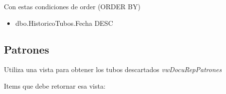 \documentclass[]{article}
\begin{document}
\par Con estas condiciones de order (ORDER BY)

\begin{itemize}[label=\textcolor{blue}{\textbullet}]
	\item dbo.HistoricoTubos.Fecha DESC
\end{itemize}

\newpage

\subsection{Patrones}

\par Utiliza una vista para obtener los tubos descartados \emph{vwDocuRepPatrones}

\par Items que debe retornar esa vista:
\end{document}
